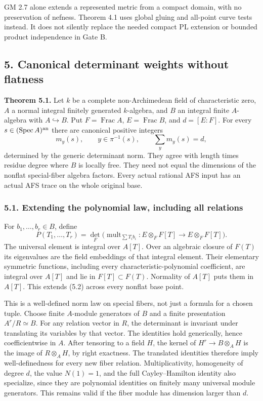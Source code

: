 \documentclass[
  10pt,
]{article}
\begin{document}
GM 2.7 alone extends a represented metric from a compact domain, with no
preservation of nefness. Theorem 4.1 uses global gluing and all-point
curve tests instead. It does not silently replace the needed compact PL
extension or bounded product independence in Gate B.

\subsection{5. Canonical determinant weights without
flatness}\label{canonical-determinant-weights-without-flatness}

\textbf{Theorem 5.1.} Let \(k\) be a complete non-Archimedean field of
characteristic zero, \(A\) a normal integral finitely generated
\(k\)-algebra, and \(B\) an integral finite \(A\)-algebra with
\(A\hookrightarrow B\). Put \(F=\operatorname{Frac}A\),
\(E=\operatorname{Frac}B\), and \(d=[E:F]\). For every
\(s\in(\operatorname{Spec}A)^{\rm an}\) there are canonical positive
integers
\[m_y(s),\qquad y\in\pi^{-1}(s),\qquad \sum_y m_y(s)=d,\tag{5.1}\]
determined by the generic determinant norm. They agree with length times
residue degree where \(B\) is locally free. They need not equal the
dimensions of the nonflat special-fiber algebra factors. Every actual
rational AFS input has an actual AFS trace on the whole original base.

\subsubsection{5.1. Extending the polynomial law, including all
relations}\label{extending-the-polynomial-law-including-all-relations}

For \(b_1,\ldots,b_r\in B\), define
\[P(T_1,\ldots,T_r)=\det_F\bigl(\operatorname{mult}_{\sum T_i b_i}:E\otimes_F F[T]\to E\otimes_F F[T]\bigr).\tag{5.2}\]
The universal element is integral over \(A[T]\). Over an algebraic
closure of \(F(T)\) its eigenvalues are the field embeddings of that
integral element. Their elementary symmetric functions, including every
characteristic-polynomial coefficient, are integral over \(A[T]\) and
lie in \(F[T]\subset F(T)\). Normality of \(A[T]\) puts them in
\(A[T]\). This extends (5.2) across every nonflat base point.

This is a well-defined norm law on special fibers, not just a formula
for a chosen tuple. Choose finite \(A\)-module generators of \(B\) and a
finite presentation \(A^r/R\simeq B\). For any relation vector in \(R\),
the determinant is invariant under translating its variables by that
vector. The identities hold generically, hence coefficientwise in \(A\).
After tensoring to a field \(H\), the kernel of \(H^r\to B\otimes_AH\)
is the image of \(R\otimes_AH\), by right exactness. The translated
identities therefore imply well-definedness for every new fiber
relation. Multiplicativity, homogeneity of degree \(d\), the value
\(N(1)=1\), and the full Cayley--Hamilton identity also specialize,
since they are polynomial identities on finitely many universal module
generators. This remains valid if the fiber module has dimension larger
than \(d\).
\end{document}
